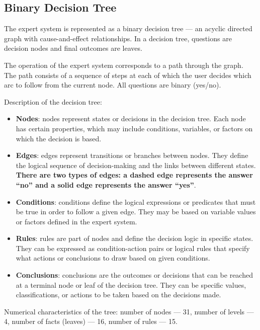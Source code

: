 \documentclass[a4paper,final]{article}
\begin{document}
\subsection{Binary Decision Tree}

The expert system is represented as a binary decision tree --- an acyclic directed graph with cause-and-effect relationships. In a decision tree, questions are decision nodes and final outcomes are leaves.

The operation of the expert system corresponds to a path through the graph. The path consists of a sequence of steps at each of which the user decides which arc to follow from the current node. All questions are binary (yes/no).

Description of the decision tree:

\begin{itemize}
	\item \textbf{Nodes}: nodes represent states or decisions in the decision tree. Each node has certain properties, which may include conditions, variables, or factors on which the decision is based.

	\item \textbf{Edges}: edges represent transitions or branches between nodes. They define the logical sequence of decision-making and the links between different states. \textbf{There are two types of edges: a dashed edge represents the answer ``no'' and a solid edge represents the answer ``yes''}.

	\item \textbf{Conditions}: conditions define the logical expressions or predicates that must be true in order to follow a given edge. They may be based on variable values or factors defined in the expert system.

	\item \textbf{Rules}: rules are part of nodes and define the decision logic in specific states. They can be expressed as condition-action pairs or logical rules that specify what actions or conclusions to draw based on given conditions.

	\item \textbf{Conclusions}: conclusions are the outcomes or decisions that can be reached at a terminal node or leaf of the decision tree. They can be specific values, classifications, or actions to be taken based on the decisions made.
\end{itemize}

Numerical characteristics of the tree: number of nodes --- 31, number of levels --- 4, number of facts (leaves) --- 16, number of rules --- 15.
\end{document}
